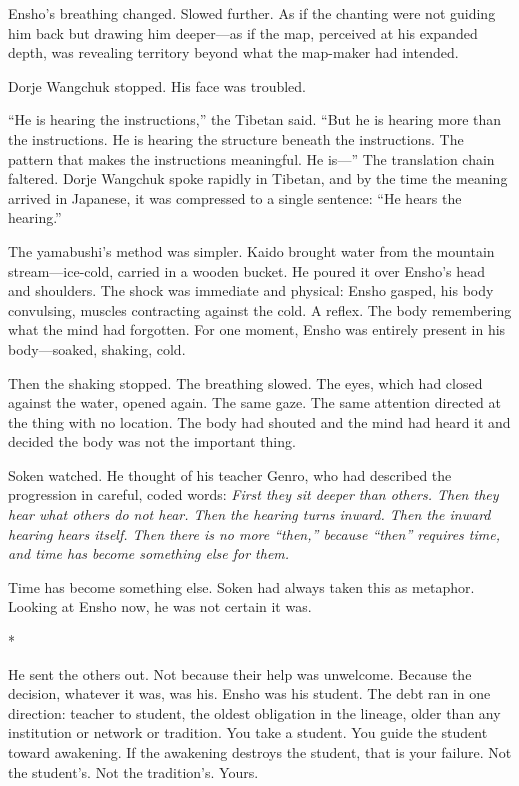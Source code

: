 Ensho's breathing changed. Slowed further. As if the chanting were not guiding him back but drawing him deeper---as if the map, perceived at his expanded depth, was revealing territory beyond what the map-maker had intended.

Dorje Wangchuk stopped. His face was troubled.

``He is hearing the instructions,'' the Tibetan said. ``But he is hearing more than the instructions. He is hearing the structure beneath the instructions. The pattern that makes the instructions meaningful. He is---'' The translation chain faltered. Dorje Wangchuk spoke rapidly in Tibetan, and by the time the meaning arrived in Japanese, it was compressed to a single sentence: ``He hears the hearing.''

The yamabushi's method was simpler. Kaido brought water from the mountain stream---ice-cold, carried in a wooden bucket. He poured it over Ensho's head and shoulders. The shock was immediate and physical: Ensho gasped, his body convulsing, muscles contracting against the cold. A reflex. The body remembering what the mind had forgotten. For one moment, Ensho was entirely present in his body---soaked, shaking, cold.

Then the shaking stopped. The breathing slowed. The eyes, which had closed against the water, opened again. The same gaze. The same attention directed at the thing with no location. The body had shouted and the mind had heard it and decided the body was not the important thing.

Soken watched. He thought of his teacher Genro, who had described the progression in careful, coded words: \emph{First they sit deeper than others. Then they hear what others do not hear. Then the hearing turns inward. Then the inward hearing hears itself. Then there is no more ``then,'' because ``then'' requires time, and time has become something else for them.}

Time has become something else. Soken had always taken this as metaphor. Looking at Ensho now, he was not certain it was.

\begin{center}
*\quad*\quad*
\end{center}

He sent the others out. Not because their help was unwelcome. Because the decision, whatever it was, was his. Ensho was his student. The debt ran in one direction: teacher to student, the oldest obligation in the lineage, older than any institution or network or tradition. You take a student. You guide the student toward awakening. If the awakening destroys the student, that is your failure. Not the student's. Not the tradition's. Yours.

